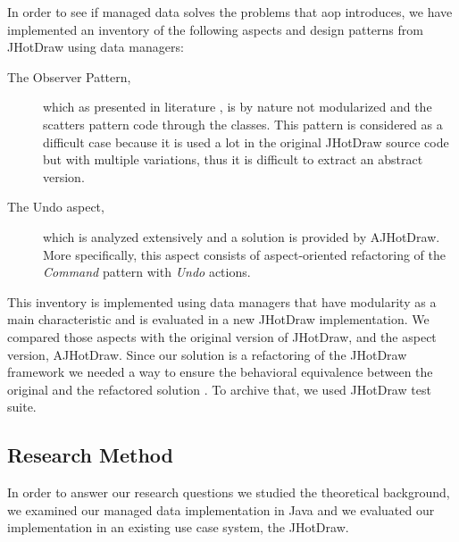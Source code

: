 In order to see if managed data solves the problems that \ac{aop} introduces, we have implemented an inventory of the following aspects and design patterns from JHotDraw using data managers:
\begin{description}

  \item[The Observer Pattern,] which as presented in literature \cite{tourwe2003existence} \cite{hannemann2005role} \cite{marin2005approach}, is by nature not modularized and the scatters pattern code through the classes. 
  This pattern is considered as a difficult case because it is used a lot in the original JHotDraw source code but with multiple variations, thus it is difficult to extract an abstract version.

  \item[The Undo aspect,] which is analyzed extensively \cite{marin2004refactoring} and a solution is provided by AJHotDraw. 
  More specifically, this aspect consists of aspect-oriented refactoring of the \textit{Command} pattern with \textit{Undo} actions.

\end{description}
This inventory is implemented using data managers that have modularity as a main characteristic and is evaluated in a new JHotDraw implementation.
We compared those aspects with the original version of JHotDraw, and the aspect version, AJHotDraw. 
Since our solution is a refactoring of the JHotDraw framework we needed a way to ensure the behavioral equivalence between the original and the refactored solution \cite{fowler2009refactoring}. 
To archive that, we used JHotDraw test suite.

\subsection{Research Method}\label{Research Method}
In order to answer our research questions we studied the theoretical background, we examined our managed data implementation in Java and we evaluated our implementation in an existing use case system, the JHotDraw.

